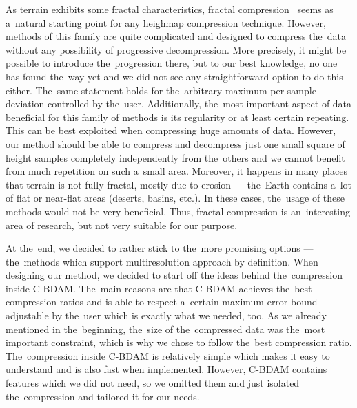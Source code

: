  As terrain exhibits some fractal characteristics, fractal compression~\cite{fractal, fractalChar} seems as a~natural starting point for any heighmap compression technique. However, methods of this family are quite complicated and designed to compress the~data without any possibility of progressive decompression. More precisely, it might be possible to introduce the~progression there, but to our best knowledge, no one has found the~way yet and we did not see any straightforward option to do this either. The~same statement holds for the~arbitrary maximum per-sample deviation controlled by the~user. Additionally, the~most important aspect of data beneficial for this family of methods is its regularity or at least certain repeating. This can be best exploited when compressing huge amounts of data. However, our method should be able to compress and decompress just one small square of height samples completely independently from the~others and we cannot benefit from much repetition on such a~small area. Moreover, it happens in many places that terrain is not fully fractal, mostly due to erosion --- the~Earth contains a~lot of flat or near-flat areas (deserts, basins, etc.). In these cases, the~usage of these methods would not be very beneficial. Thus, fractal compression is an~interesting area of research, but not very suitable for our purpose.
  
 At the~end, we decided to rather stick to the~more promising options --- the~methods which support multiresolution approach by definition. When designing our method, we decided to start off the ideas behind the~compression inside C-BDAM. The~main reasons are that C-BDAM achieves the~best compression ratios and is able to respect a~certain maximum-error bound adjustable by the~user which is exactly what we needed, too. As we already mentioned in the~beginning, the~size of the~compressed data was the~most important constraint, which is why we chose to follow the~best compression ratio. The~compression inside C-BDAM is relatively simple which makes it easy to understand and is also fast when implemented. However, C-BDAM contains features which we did not need, so we omitted t\textsl{}hem and just isolated the~compression and tailored it for our needs. 
 
